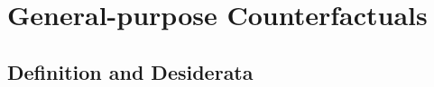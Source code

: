 \section{General-purpose Counterfactuals}
\label{sec:general_purpose}

% 
\subsection{Definition and Desiderata}
\label{sec:desiderata}


